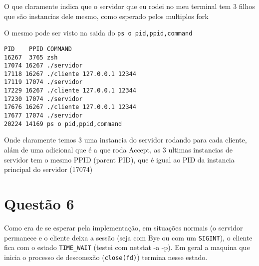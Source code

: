 \documentclass[11pt]{article}
\begin{document}
O que claramente indica que o servidor que eu rodei no meu terminal
tem 3 filhos que são instancias dele mesmo, como esperado pelos
multiplos fork

O mesmo pode ser visto na saida do \texttt{ps o pid,ppid,command}
\begin{verbatim}
PID    PPID COMMAND
16267  3765 zsh
17074 16267 ./servidor
17118 16267 ./cliente 127.0.0.1 12344
17119 17074 ./servidor
17229 16267 ./cliente 127.0.0.1 12344
17230 17074 ./servidor
17676 16267 ./cliente 127.0.0.1 12344
17677 17074 ./servidor
20224 14169 ps o pid,ppid,command
\end{verbatim}


Onde claramente temos  3 uma instancia do servidor rodando para cada
cliente, alám de uma adicional que é a que roda Accept, as 3 ultimas
instancias de servidor tem o mesmo PPID (parent PID), que é igual ao
PID da instancia principal do servidor (17074)
\section{Questão 6}
\label{sec-6}
Como era de se esperar pela implementação, em situações normais (o
servidor permanece e o cliente deixa a sessão (seja com Bye ou com
um \texttt{SIGINT}), o cliente fica com o estado \texttt{TIME\_WAIT} (testei com
netstat -a -p). Em geral a maquina que inicia o processo de
desconexão (\texttt{close(fd)}) termina nesse estado.
\end{document}
